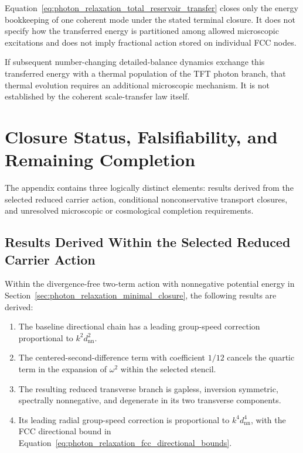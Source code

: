 Equation~\eqref{eq:photon_relaxation_total_reservoir_transfer} closes only the
energy bookkeeping of one coherent mode under the stated terminal closure. It
does not specify how the transferred energy is partitioned among allowed
microscopic excitations and does not imply fractional action stored on
individual FCC nodes.

If subsequent number-changing detailed-balance dynamics exchange this
transferred energy with a thermal population of the TFT photon branch, that
thermal evolution requires an additional microscopic mechanism. It is not
established by the coherent scale-transfer law itself.


\section{Closure Status, Falsifiability, and Remaining Completion}
\label{sec:photon_relaxation_status}

The appendix contains three logically distinct elements: results derived from
the selected reduced carrier action, conditional nonconservative transport
closures, and unresolved microscopic or cosmological completion requirements.


\subsection{Results Derived Within the Selected Reduced Carrier Action}
\label{subsec:photon_relaxation_derived_status}

Within the divergence-free two-term action with nonnegative potential energy
in Section~\ref{sec:photon_relaxation_minimal_closure}, the following results
are derived:

\begin{enumerate}
    \item The baseline directional chain has a leading group-speed correction
    proportional to
    \(k^2d_{\mathrm{nn}}^2\).

    \item The centered-second-difference term with coefficient \(1/12\)
    cancels the quartic term in the expansion of \(\omega^2\) within the
    selected stencil.

    \item The resulting reduced transverse branch is gapless, inversion
    symmetric, spectrally nonnegative, and degenerate in its two transverse
    components.

    \item Its leading radial group-speed correction is proportional to
    \(k^4d_{\mathrm{nn}}^4\), with the FCC directional bound in
    Equation~\eqref{eq:photon_relaxation_fcc_directional_bounds}.
\end{enumerate}

